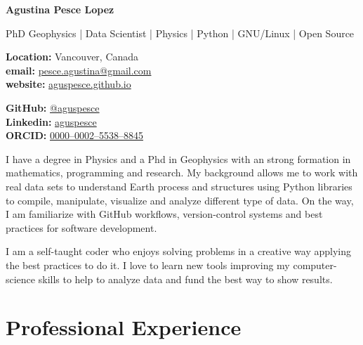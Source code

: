 \documentclass[10pt, a4paper]{article}
\makeatletter
\newcommand{\firstname}{Agustina}
\newcommand{\familyname}{Pesce Lopez}
\newcommand{\email}{pesce.agustina@gmail.com}
\newcommand{\website}{aguspesce.github.io}
\newcommand{\github}{aguspesce}
\newcommand{\linkedin}{aguspesce}
\newcommand{\orcid}{0000--0002--5538--8845}
\newcommand{\fullname}{\firstname{} \familyname}
\newcommand{\maintitle}[1]{
    \begin{center}
        \textbf{\Huge #1}
    \end{center}
}
\newcommand{\subtitle}[1]{
    \begin{center}
        {\large #1}
    \end{center}
}
\newcommand{\affiliation}[1]{
    \begin{center}
        {#1}
    \end{center}
}
\newcommand{\entriespad}{0.75em}
\newcommand{\MAIL}[1]{\href{mailto:#1}{#1}}
\newcommand{\GITHUB}[1]{\href{https://github.com/#1}{@#1}}
\newcommand{\ORCID}[1]{\href{https://orcid.org/#1}{#1}}
\newcommand{\WEBSITE}[1]{\href{https://#1}{#1}}
\newcommand{\LINKEDIN}[1]{\href{https://linkedin.com/in/#1}{#1}}
\makeatother
\begin{document}
\maintitle{\fullname}
\subtitle{PhD Geophysics | Data Scientist | Physics | Python | GNU/Linux | Open
Source}
\vspace{\entriespad}

\begin{minipage}[t]{0.60\linewidth}
    \begin{flushleft}
        \textbf{Location:} Vancouver, Canada
        \\
        \textbf{email:} \MAIL{\email}
        \\
        \textbf{website:} \WEBSITE{\website}
    \end{flushleft}
\end{minipage}
\hfill
\begin{minipage}[t]{0.40\linewidth}
    \begin{flushright}
        \textbf{GitHub:} \GITHUB{\github}
        \\
        \textbf{Linkedin:} \LINKEDIN{\linkedin}
        \\
        \textbf{ORCID:} \ORCID{\orcid}
    \end{flushright}
\end{minipage}

\vspace{\entriespad}



\vspace{\entriespad}

I have a degree in Physics and a Phd in Geophysics with an strong formation in
mathematics, programming and research.
My background allows me to work with real data sets to understand Earth process
and structures using Python libraries to compile, manipulate, visualize and
analyze different type of data.
On the way, I am familiarize with GitHub workflows, version-control systems and
best practices for software development.
\vspace{\entriespad}

I am a self-taught coder who enjoys solving problems in a creative way applying
the best practices to do it.
I love to learn new tools improving my computer-science skills to help to
analyze data and fund the best way to show results.

\section{Professional Experience}
\end{document}
